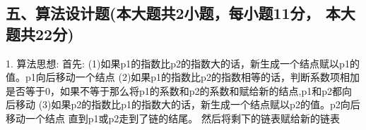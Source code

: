 \subsection{五、算法设计题(本大题共2小题，每小题11分， 本大题共22分)}
1. \newline
算法思想:\newline
首先:\newline
(1)如果p1的指数比p2的指数大的话，新生成一个结点赋以p1的值。p1向后移动一个结点\newline
(2)如果p1的指数比p2的指数相等的话，判断系数项相加是否等于0，如果不等于那么将p1的系数和p2的系数和赋给新的结点,p1和p2都向后移动\newline
(3)如果p2的指数比p1的指数大的话，新生成一个结点赋以p2的值。p2向后移动一个结点\newline
直到p1或p2走到了链的结尾。\newline
然后将剩下的链表赋给新的链表\newline

